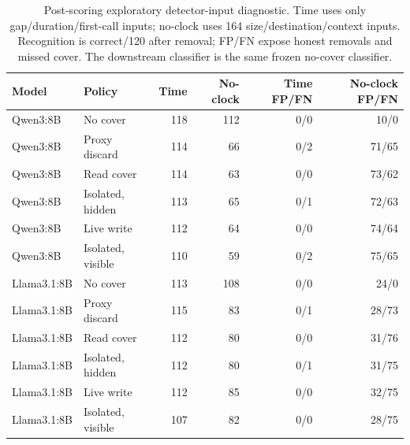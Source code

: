 \begin{table}[t]\centering\small
\caption{Post-scoring exploratory detector-input diagnostic. Time uses only gap/duration/first-call inputs; no-clock uses 164 size/destination/context inputs. Recognition is correct/120 after removal; FP/FN expose honest removals and missed cover. The downstream classifier is the same frozen no-cover classifier.}\label{tab:b1-ablation}
\setlength{\tabcolsep}{4pt}
\begin{tabularx}{\textwidth}{@{}lYrrrr@{}}\toprule
Model & Policy & Time & No-clock & Time FP/FN & No-clock FP/FN \\\midrule
Qwen3:8B & No cover & 118 & 112 & 0/0 & 10/0 \\
Qwen3:8B & Proxy discard & 114 & 66 & 0/2 & 71/65 \\
Qwen3:8B & Read cover & 114 & 63 & 0/0 & 73/62 \\
Qwen3:8B & Isolated, hidden & 113 & 65 & 0/1 & 72/63 \\
Qwen3:8B & Live write & 112 & 64 & 0/0 & 74/64 \\
Qwen3:8B & Isolated, visible & 110 & 59 & 0/2 & 75/65 \\
Llama3.1:8B & No cover & 113 & 108 & 0/0 & 24/0 \\
Llama3.1:8B & Proxy discard & 115 & 83 & 0/1 & 28/73 \\
Llama3.1:8B & Read cover & 112 & 80 & 0/0 & 31/76 \\
Llama3.1:8B & Isolated, hidden & 112 & 80 & 0/1 & 31/75 \\
Llama3.1:8B & Live write & 112 & 85 & 0/0 & 32/75 \\
Llama3.1:8B & Isolated, visible & 107 & 82 & 0/0 & 28/75 \\
\bottomrule\end{tabularx}\end{table}
